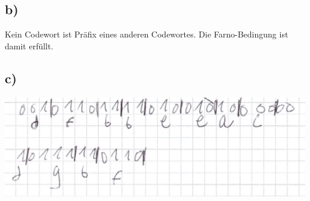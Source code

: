 \documentclass{article}
\begin{document}
	\subsection*{b)}
	Kein Codewort ist Präfix eines anderen Codewortes. Die Farno-Bedingung ist damit erfüllt.
	\subsection*{c)}
	\includegraphics[width=\linewidth]{106c}
\end{document}
